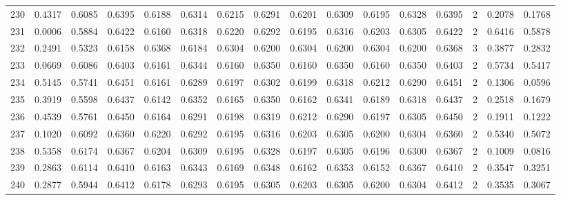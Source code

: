 \begin{tabular}{lrrrrrrrrrrrrrrr}
230 &      0.4317 &  0.6085 &  0.6395 &  0.6188 &  0.6314 &  0.6215 &  0.6291 &  0.6201 &  0.6309 &  0.6195 &   0.6328 &     0.6395 &      2 &                    0.2078 &                     0.1768 \\
231 &      0.0006 &  0.5884 &  0.6422 &  0.6160 &  0.6318 &  0.6220 &  0.6292 &  0.6195 &  0.6316 &  0.6203 &   0.6305 &     0.6422 &      2 &                    0.6416 &                     0.5878 \\
232 &      0.2491 &  0.5323 &  0.6158 &  0.6368 &  0.6184 &  0.6304 &  0.6200 &  0.6304 &  0.6200 &  0.6304 &   0.6200 &     0.6368 &      3 &                    0.3877 &                     0.2832 \\
233 &      0.0669 &  0.6086 &  0.6403 &  0.6161 &  0.6344 &  0.6160 &  0.6350 &  0.6160 &  0.6350 &  0.6160 &   0.6350 &     0.6403 &      2 &                    0.5734 &                     0.5417 \\
234 &      0.5145 &  0.5741 &  0.6451 &  0.6161 &  0.6289 &  0.6197 &  0.6302 &  0.6199 &  0.6318 &  0.6212 &   0.6290 &     0.6451 &      2 &                    0.1306 &                     0.0596 \\
235 &      0.3919 &  0.5598 &  0.6437 &  0.6142 &  0.6352 &  0.6165 &  0.6350 &  0.6162 &  0.6341 &  0.6189 &   0.6318 &     0.6437 &      2 &                    0.2518 &                     0.1679 \\
236 &      0.4539 &  0.5761 &  0.6450 &  0.6164 &  0.6291 &  0.6198 &  0.6319 &  0.6212 &  0.6290 &  0.6197 &   0.6305 &     0.6450 &      2 &                    0.1911 &                     0.1222 \\
237 &      0.1020 &  0.6092 &  0.6360 &  0.6220 &  0.6292 &  0.6195 &  0.6316 &  0.6203 &  0.6305 &  0.6200 &   0.6304 &     0.6360 &      2 &                    0.5340 &                     0.5072 \\
238 &      0.5358 &  0.6174 &  0.6367 &  0.6204 &  0.6309 &  0.6195 &  0.6328 &  0.6197 &  0.6305 &  0.6196 &   0.6300 &     0.6367 &      2 &                    0.1009 &                     0.0816 \\
239 &      0.2863 &  0.6114 &  0.6410 &  0.6163 &  0.6343 &  0.6169 &  0.6348 &  0.6162 &  0.6353 &  0.6152 &   0.6367 &     0.6410 &      2 &                    0.3547 &                     0.3251 \\
240 &      0.2877 &  0.5944 &  0.6412 &  0.6178 &  0.6293 &  0.6195 &  0.6305 &  0.6203 &  0.6305 &  0.6200 &   0.6304 &     0.6412 &      2 &                    0.3535 &                     0.3067 \\

\end{tabular}
